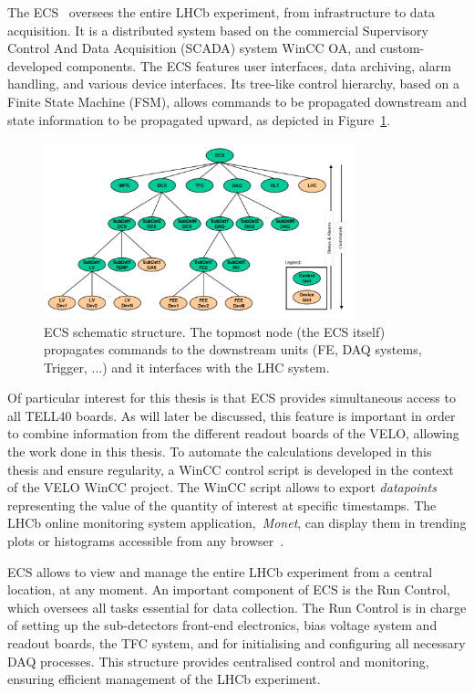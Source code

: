 The ECS~\cite{GranadoCardoso:2702137} oversees the entire LHCb experiment, from infrastructure to data acquisition. It is a distributed system based on the commercial Supervisory Control And Data Acquisition (SCADA) system WinCC OA, and custom-developed components. The ECS features user interfaces, data archiving, alarm handling, and various device interfaces. Its tree-like control hierarchy, based on a Finite State Machine (FSM), allows commands to be propagated downstream and state information to be propagated upward, as depicted in Figure~\ref{fig:ECS_tree}.
\begin{figure}
    \centering
    \includegraphics[width=0.8\textwidth]{figures/ECS_tree.png}
    \caption{ECS schematic structure. The topmost node (the ECS itself) propagates commands to the downstream units (FE, DAQ systems, Trigger, ...) and it interfaces with the LHC system.}
    \label{fig:ECS_tree}
\end{figure}

Of particular interest for this thesis is that ECS provides simultaneous access to all TELL40 boards. As will later be discussed, this feature is important in order to combine information from the different readout boards of the VELO, allowing the work done in this thesis. To automate the calculations developed in this thesis and ensure regularity, a WinCC control script is developed in the context of the VELO WinCC project. The WinCC script allows to export \textit{datapoints} representing the value of the quantity of interest at specific timestamps. The LHCb online monitoring system application,~\textit{Monet}, can display them in trending plots or histograms accessible from any browser~\cite{Adinolfi:2298467}.

ECS allows to view and manage the entire LHCb experiment from a central location, at any moment. An important component of ECS is the Run Control, which oversees all tasks essential for data collection. The Run Control is in charge of setting up the sub-detectors front-end electronics, bias voltage system and readout boards, the TFC system, and for initialising and configuring all necessary DAQ processes. 
This structure provides centralised control and monitoring, ensuring efficient management of the LHCb experiment.